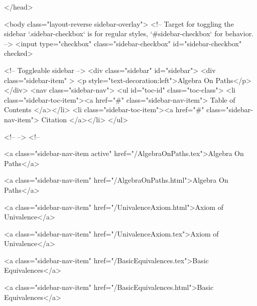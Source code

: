   
</head>




  <body class="layout-reverse sidebar-overlay">
    <!-- Target for toggling the sidebar `.sidebar-checkbox` is for regular
     styles, `#sidebar-checkbox` for behavior. -->
<input type="checkbox" class="sidebar-checkbox" id="sidebar-checkbox" checked>

<!-- Toggleable sidebar -->
<div class="sidebar" id="sidebar">
  <div class="sidebar-item" >
    <p style="text-decoration:left">Algebra On Paths</p>
  </div>
  <nav class="sidebar-nav">
    <ul id="toc-id" class="toc-class">
  <li class="sidebar-toc-item"><a href="#" class="sidebar-nav-item"> Table of Contents </a></li>
  <li class="sidebar-toc-item"><a href="#" class="sidebar-nav-item"> Citation </a></li>
</ul>


    <!--  -->
    <!-- 
      
    
      
    
      
    
      
    
      
        
      
    
      
        
          <a class="sidebar-nav-item active" href="/AlgebraOnPaths.tex">Algebra On Paths</a>
        
      
    
      
        
          <a class="sidebar-nav-item" href="/AlgebraOnPaths.html">Algebra On Paths</a>
        
      
    
      
        
          <a class="sidebar-nav-item" href="/UnivalenceAxiom.html">Axiom of Univalence</a>
        
      
    
      
        
          <a class="sidebar-nav-item" href="/UnivalenceAxiom.tex">Axiom of Univalence</a>
        
      
    
      
        
          <a class="sidebar-nav-item" href="/BasicEquivalences.tex">Basic Equivalences</a>
        
      
    
      
        
          <a class="sidebar-nav-item" href="/BasicEquivalences.html">Basic Equivalences</a>
        
